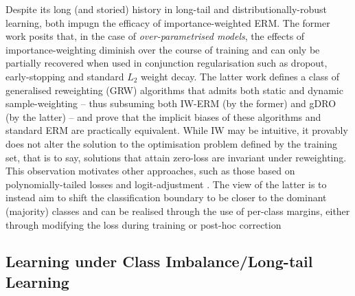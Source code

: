 Despite its long (and storied) history in long-tail and distributionally-robust learning,
\cite{byrd2019effect, zhai2022understanding} both impugn the efficacy of importance-weighted ERM. 
%
The former work posits that, in the case of \emph{over-parametrised models}, the effects of
importance-weighting diminish over the course of training and can only be partially recovered when
used in conjunction regularisation such as dropout, early-stopping and standard \(L_2\) weight
decay. 
%
The latter work defines a class of generalised reweighting (GRW) algorithms that admits both static
and dynamic sample-weighting -- thus subsuming both IW-ERM (by the former) and gDRO (by the latter)
-- and prove that the implicit biases of these algorithms and standard ERM are practically
equivalent.
%
While IW may be intuitive, it provably does not alter the solution to the optimisation problem
defined by the training set, that is to say, solutions that attain zero-loss are invariant under
reweighting.
%
This observation motivates other approaches, such as those based on polynomially-tailed losses
\citep{wang2021importance} and logit-adjustment \citep{menon2020long}.
%
The view of the latter is to instead aim to shift the classification boundary to be closer to the
dominant (majority) classes and can be realised through the use of per-class margins, either
through modifying the loss during training or post-hoc correction \cite{fawcett1996combining} 

\subsection{Learning under Class Imbalance/Long-tail Learning}

